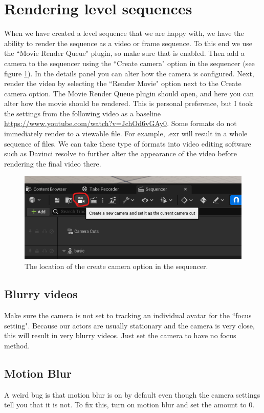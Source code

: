 \documentclass{uva-inf-article}
\begin{document}
\section{Rendering level sequences}
When we have created a level sequence that we are happy with, we have the ability to render the sequence as a video or frame sequence. To this end we use the ``Movie Render Queue" plugin, so make sure that is enabled. Then add a camera to the sequencer using the ``Create camera" option in the sequencer (see figure \ref{fig:createCam}). In the details panel you can alter how the camera is configured. Next, render the video by selecting the ``Render Movie" option next to the Create camera option. The Movie Render Queue plugin should open, and here you can alter how the movie should be rendered. This is personal preference, but I took the settings from the following video as a baseline \url{https://www.youtube.com/watch?v=JchOd6vGAy0}. Some formats do not immediately render to a viewable file. For example, .exr will result in a whole sequence of files. We can take these type of formats into video editing software such as Davinci resolve to further alter the appearance of the video before rendering the final video there.

\begin{figure}[hbt!]
    \centering
    \includegraphics[width=.9\textwidth]{imgs/addcamera.png}
    \caption{The location of the create camera option in the sequencer.}
    \label{fig:createCam}
\end{figure}

\subsection{Blurry videos}
Make sure the camera is not set to tracking an individual avatar for the ``focus setting". Because our actors are usually stationary and the camera is very close, this will result in very blurry videos. Just set the camera to have no focus method.

\subsection{Motion Blur}
A weird bug is that motion blur is on by default even though the camera settings tell you that it is not. To fix this, turn on motion blur and set the amount to 0.
\end{document}
